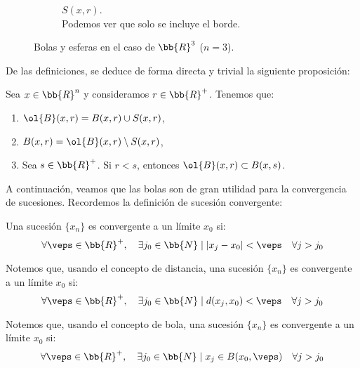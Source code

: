\begin{ejemplo}
\begin{enumerate}
\begin{samepage}
\begin{figure}[H]
\begin{subfigure}[b]{0.3\textwidth}
                \caption{$S(x,r)$. \\{\centering Podemos ver que solo se incluye el borde.}}
            \end{subfigure}
            \caption{Bolas y esferas en el caso de $\bb{R}^3$ ($n=3$).}
        \end{figure}
        \end{samepage}
    \end{enumerate}
\end{ejemplo}


De las definiciones, se deduce de forma directa y trivial la siguiente proposición:
\begin{prop}
    Sea $x\in \bb{R}^n$ y consideramos $r\in \bb{R}^+$. Tenemos que:
    \begin{enumerate}
        \item $\ol{B}(x,r)=B(x,r)\cup S(x,r)$,
        \item $B(x,r)=\ol{B}(x,r)\setminus S(x,r)$,
        \item Sea $s\in \bb{R}^+$. Si $r<s$, entonces $\ol{B}(x,r)\subset B(x,s)$.
    \end{enumerate}
\end{prop}

A continuación, veamos que las bolas son de gran utilidad para la convergencia de sucesiones. Recordemos la definición de sucesión convergente:
\begin{definicion}
    Una sucesión $\{x_n\}$ es convergente a un límite $x_0$ si:
    \begin{equation*}
        \forall \veps\in \bb{R}^+,\quad \exists j_0\in \bb{N}\mid |x_j-x_0|<\veps \quad \forall j>j_0 
    \end{equation*}
\end{definicion}

\begin{observacion}
    Notemos que, usando el concepto de distancia, una sucesión $\{x_n\}$ es convergente a un límite $x_0$ si:
    \begin{equation*}
        \forall \veps\in \bb{R}^+,\quad \exists j_0\in \bb{N}\mid d(x_j,x_0)<\veps \quad \forall j>j_0 
    \end{equation*}

    Notemos que, usando el concepto de bola, una sucesión $\{x_n\}$ es convergente a un límite $x_0$ si:
        \begin{equation*}
            \forall \veps\in \bb{R}^+,\quad \exists j_0\in \bb{N}\mid x_j\in B(x_0,\veps) \quad \forall j>j_0 
        \end{equation*}
\end{observacion}



